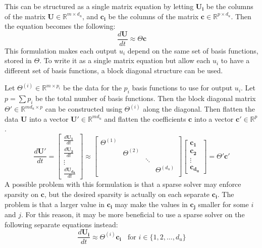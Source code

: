 \documentclass{article}
\let\vec\mathbf
\def\real{\mathbb{R}}
\begin{document}
This can be structured as a single matrix equation by letting $\vec{U_i}$ be the
columns of the matrix $\vec{U} \in \real^{m \times d_u}$, and $\vec{c_i}$ be the
columns of the matrix $\vec{c} \in \real^{p \times d_u}$. Then the equation
becomes the following:
\begin{equation*}
\frac{d\vec{U}}{dt} \approx \Theta \vec{c}
\end{equation*}
This formulation makes each output $u_i$ depend on the same set of basis
functions, stored in $\Theta$. To write it as a single matrix equation but allow
each $u_i$ to have a different set of basis functions, a block diagonal
structure can be used.

Let $\Theta^{(i)} \in \real^{m \times p_i}$ be the data for the $p_i$ basis
functions to use for output $u_i$. Let $p = \sum p_i$ be the total number of
basis functions. Then the block diagonal matrix $\Theta' \in \real^{md_u \times p}$ can be constructed
using $\Theta^{(i)}$ along the diagonal. Then flatten the data $\vec{U}$ into a
vector $\vec{U'} \in \real^{md_u}$ and flatten the coefficients $\vec{c}$ into a
vector $\vec{c}' \in \real^{p}$.
\begin{equation}\label{eq:dx0-dudt-separate-theta}
\frac{d\vec{U'}}{dt} = 
\begin{bmatrix}
\frac{d\vec{U_1}}{dt} \\ \frac{d\vec{U_2}}{dt} \\ \vdots \\ \frac{d\vec{U_{d_u}}}{dt}
\end{bmatrix}
\approx
\begin{bmatrix}
\Theta^{(1)} \\
& \Theta^{(2)} \\
& & \ddots \\
& & & \Theta^{(d_u)} \\
\end{bmatrix}
\begin{bmatrix}
\vec{c_1} \\ \vec{c_2} \\ \vdots \\ \vec{c_{d_u}}
\end{bmatrix}
= \Theta' \vec{c}'
\end{equation}
A possible problem with this formulation is that a sparse solver may enforce
sparsity on $\vec{c}$, but the desired sparsity is actually on each separate
$\vec{c_i}$. The problem is that a larger value in $\vec{c_i}$ may make the
values in $\vec{c_j}$ smaller for some $i$ and $j$. For this reason, it may be
more beneficial to use a sparse solver on the following separate equations instead:
\begin{equation}\label{eq:diff-theta-eqs}
\frac{d\vec{U_i}}{dt} \approx \Theta^{(i)} \vec{c_i} \,\,\ \text{ for $i \in \{1,2,\hdots,d_u\} $}
\end{equation}
\end{document}
